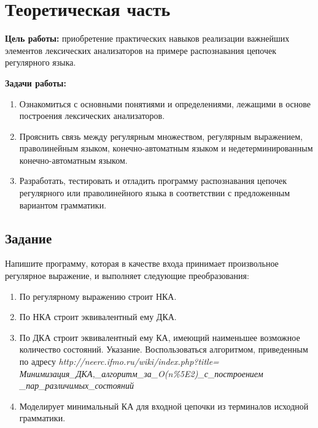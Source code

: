 \section{Теоретическая часть}

\textbf{Цель работы:} приобретение практических навыков реализации важнейших элементов лексических анализаторов на примере распознавания цепочек регулярного языка.

\textbf{Задачи работы:}

\begin{enumerate}
	\item Ознакомиться с основными понятиями и определениями, лежащими в основе построения лексических анализаторов.
	\item Прояснить связь между регулярным множеством, регулярным выражением, праволинейным языком, конечно-автоматным языком и недетерминированным конечно-автоматным языком.
	\item Разработать, тестировать и отладить программу распознавания цепочек регулярного или праволинейного языка в соответствии с предложенным вариантом грамматики.
\end{enumerate}

\subsection{Задание}

Напишите программу, которая в качестве входа принимает произвольное регулярное выражение, и выполняет следующие преобразования:

\begin{enumerate}
\item По регулярному выражению строит НКА.
\item По НКА строит эквивалентный ему ДКА.
\item По ДКА строит эквивалентный ему КА, имеющий наименьшее возможное количество состояний. Указание. 
Воспользоваться алгоритмом, приведенным по адресу \textit{http://neerc.ifmo.ru/wiki/index.php?title=\\Минимизация\_ДКА,\_алгоритм\_за\_O(n\%5E2)\_с\_построением \_пар\_различимых\_состояний}
\item Моделирует минимальный КА для входной цепочки из терминалов исходной грамматики.
\end{enumerate}

\newpage